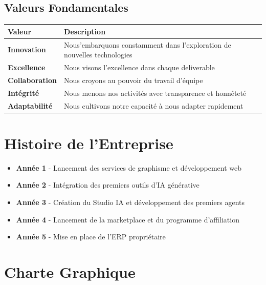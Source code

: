 \documentclass[12pt,a4paper,oneside]{book}
\begin{document}
\subsection{Valeurs Fondamentales}
\bigskip
\begin{tabular}{|p{3cm}|p{12cm}|}
\hline
\rowcolor{electronblue}
\color{white}\textbf{Valeur} & \color{white}\textbf{Description} \\
\hline
\textbf{Innovation} & Nous'embarquons constamment dans l'exploration de nouvelles technologies \\
\hline
\textbf{Excellence} & Nous visons l'excellence dans chaque deliverable \\
\hline
\textbf{Collaboration} & Nous croyons au pouvoir du travail d'équipe \\
\hline
\textbf{Intégrité} & Nous menons nos activités avec transparence et honnêteté \\
\hline
\textbf{Adaptabilité} & Nous cultivons notre capacité à nous adapter rapidement \\
\hline
\end{tabular}

\section{Histoire de l'Entreprise}
\begin{itemize}
\item \textbf{Année 1} - Lancement des services de graphisme et développement web
\item \textbf{Année 2} - Intégration des premiers outils d'IA générative
\item \textbf{Année 3} - Création du Studio IA et développement des premiers agents
\item \textbf{Année 4} - Lancement de la marketplace et du programme d'affiliation
\item \textbf{Année 5} - Mise en place de l'ERP propriétaire
\end{itemize}

\section{Charte Graphique}
\end{document}
